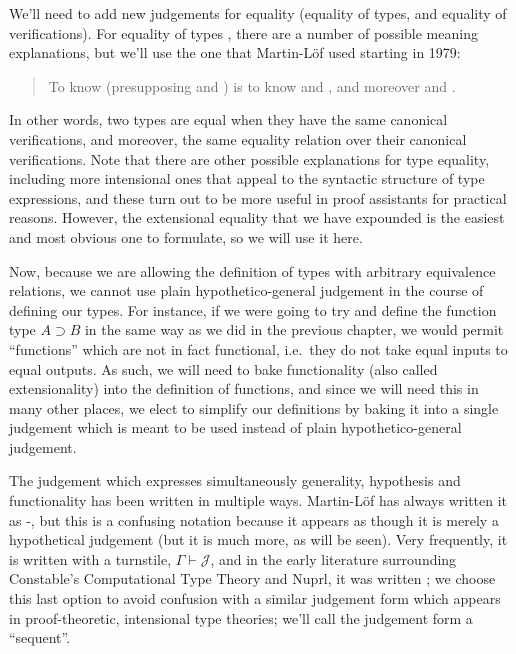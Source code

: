 \documentclass[main.tex]{subfiles}
\begin{document}
We'll need to add new judgements for equality (equality of types, and equality
of verifications). For equality of types , there are a
number of possible meaning explanations, but we'll use the one that
Martin-L\"of used starting in 1979:

\begin{quote}
  To know  (presupposing  and ) is to know
 and
, and moreover
 and
.
\end{quote}

In other words, two types are equal when they have the same canonical
verifications, and moreover, the same equality relation over their canonical
verifications. Note that there are other possible explanations for type
equality, including more intensional ones that appeal to the syntactic
structure of type expressions, and these turn out to be more useful in proof
assistants for practical reasons. However, the extensional equality that we
have expounded is the easiest and most obvious one to formulate, so we will
use it here.

Now, because we are allowing the definition of types with arbitrary equivalence
relations, we cannot use plain hypothetico-general judgement in the course of
defining our types. For instance, if we were going to try and define the
function type $A\supset B$ in the same way as we did in the previous chapter,
we would permit ``functions'' which are not in fact functional, i.e.\ they do
not take equal inputs to equal outputs. As such, we will need to bake
functionality (also called extensionality) into the definition of functions,
and since we will need this in many other places, we elect to simplify our
definitions by baking it into a single judgement which is meant to be used
instead of plain hypothetico-general judgement.

The judgement which expresses simultaneously generality, hypothesis and
functionality has been written in multiple ways. Martin-L\"of has always
written it as \hyp{}{\Gamma}, but this is a confusing notation
because it appears as though it is merely a hypothetical judgement (but it is
much more, as will be seen). Very frequently, it is written with a turnstile,
$\Gamma\vdash\mathcal{J}$, and in the early literature surrounding Constable's
Computational Type Theory and Nuprl, it was written
; we choose this last option to avoid
confusion with a similar judgement form which appears in proof-theoretic,
intensional type theories; we'll call the judgement form a ``sequent''.
\end{document}
